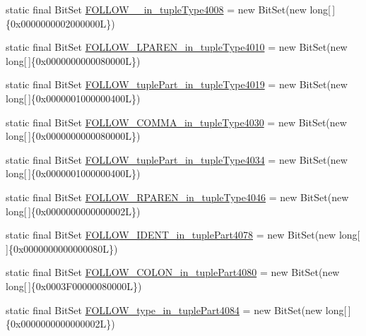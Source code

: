 \begin{DoxyCompactItemize}
\item 
static final Bit\-Set \hyperlink{classorg_1_1tzi_1_1use_1_1parser_1_1shell_1_1_shell_command_parser_ab9b62b6e28ad84d2104858e9cc639cf1}{F\-O\-L\-L\-O\-W\-\_\-\_\-in\-\_\-tuple\-Type4008} = new Bit\-Set(new long\mbox{[}$\,$\mbox{]}\{0x0000000002000000\-L\})
\item 
static final Bit\-Set \hyperlink{classorg_1_1tzi_1_1use_1_1parser_1_1shell_1_1_shell_command_parser_a4fa1a1c49f5d8b5ad5b3631c9e900052}{F\-O\-L\-L\-O\-W\-\_\-\-L\-P\-A\-R\-E\-N\-\_\-in\-\_\-tuple\-Type4010} = new Bit\-Set(new long\mbox{[}$\,$\mbox{]}\{0x0000000000080000\-L\})
\item 
static final Bit\-Set \hyperlink{classorg_1_1tzi_1_1use_1_1parser_1_1shell_1_1_shell_command_parser_af8c54fa458c6f18111f6f0fa0c47c0d8}{F\-O\-L\-L\-O\-W\-\_\-tuple\-Part\-\_\-in\-\_\-tuple\-Type4019} = new Bit\-Set(new long\mbox{[}$\,$\mbox{]}\{0x0000001000000400\-L\})
\item 
static final Bit\-Set \hyperlink{classorg_1_1tzi_1_1use_1_1parser_1_1shell_1_1_shell_command_parser_a06e98f077f7f2abb9b19227e59feb1a5}{F\-O\-L\-L\-O\-W\-\_\-\-C\-O\-M\-M\-A\-\_\-in\-\_\-tuple\-Type4030} = new Bit\-Set(new long\mbox{[}$\,$\mbox{]}\{0x0000000000080000\-L\})
\item 
static final Bit\-Set \hyperlink{classorg_1_1tzi_1_1use_1_1parser_1_1shell_1_1_shell_command_parser_aca2d232d572f8553ffbb8da8af987a8b}{F\-O\-L\-L\-O\-W\-\_\-tuple\-Part\-\_\-in\-\_\-tuple\-Type4034} = new Bit\-Set(new long\mbox{[}$\,$\mbox{]}\{0x0000001000000400\-L\})
\item 
static final Bit\-Set \hyperlink{classorg_1_1tzi_1_1use_1_1parser_1_1shell_1_1_shell_command_parser_a37a7a7f0ec7ecfe76254289b96a4f831}{F\-O\-L\-L\-O\-W\-\_\-\-R\-P\-A\-R\-E\-N\-\_\-in\-\_\-tuple\-Type4046} = new Bit\-Set(new long\mbox{[}$\,$\mbox{]}\{0x0000000000000002\-L\})
\item 
static final Bit\-Set \hyperlink{classorg_1_1tzi_1_1use_1_1parser_1_1shell_1_1_shell_command_parser_a064a66d3a47802037090348ce1bb588b}{F\-O\-L\-L\-O\-W\-\_\-\-I\-D\-E\-N\-T\-\_\-in\-\_\-tuple\-Part4078} = new Bit\-Set(new long\mbox{[}$\,$\mbox{]}\{0x0000000000000080\-L\})
\item 
static final Bit\-Set \hyperlink{classorg_1_1tzi_1_1use_1_1parser_1_1shell_1_1_shell_command_parser_ad89c9478165c8c93b80458be84fbb044}{F\-O\-L\-L\-O\-W\-\_\-\-C\-O\-L\-O\-N\-\_\-in\-\_\-tuple\-Part4080} = new Bit\-Set(new long\mbox{[}$\,$\mbox{]}\{0x0003\-F00000080000\-L\})
\item 
static final Bit\-Set \hyperlink{classorg_1_1tzi_1_1use_1_1parser_1_1shell_1_1_shell_command_parser_a2d85117d54ee70b47010c34e59905aef}{F\-O\-L\-L\-O\-W\-\_\-type\-\_\-in\-\_\-tuple\-Part4084} = new Bit\-Set(new long\mbox{[}$\,$\mbox{]}\{0x0000000000000002\-L\})

\end{DoxyCompactItemize}
